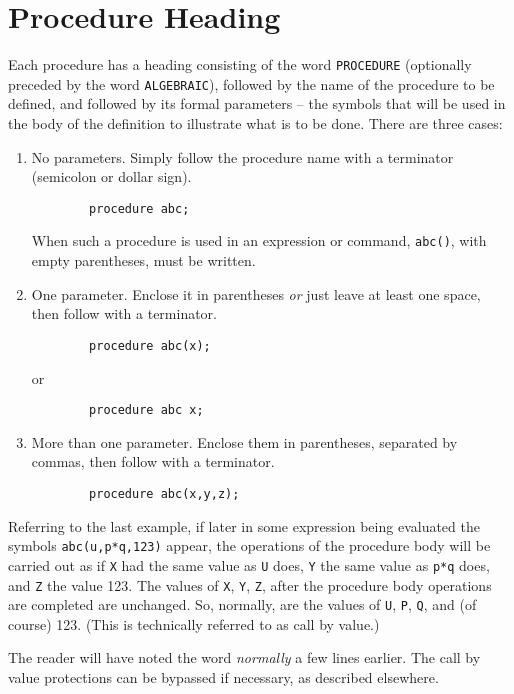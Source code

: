 \section{Procedure Heading}

Each procedure has a heading consisting of the word {\tt PROCEDURE}
(optionally preceded by the word {\tt ALGEBRAIC}), followed by the name of
the procedure to be defined, and followed by its formal parameters -- the
symbols that will be used in the body of the definition to illustrate
what is to be done.  There are three cases:
\begin{enumerate}
\item No parameters. Simply follow the procedure name with a terminator
(semicolon or dollar sign).
\begin{verbatim}
        procedure abc;
\end{verbatim}

When such a procedure is used in an expression or command, {\tt abc()}, with
empty parentheses, must be written.

\item One parameter.  Enclose it in parentheses {\em or\/} just leave at
least one space, then follow with a terminator.
\begin{verbatim}
        procedure abc(x);
\end{verbatim}
or
\begin{verbatim}
        procedure abc x;
\end{verbatim}

\item More than one parameter. Enclose them in parentheses, separated by
commas, then follow with a terminator.
\begin{verbatim}
        procedure abc(x,y,z);
\end{verbatim}
\end{enumerate}
Referring to the last example, if later in some expression being evaluated
the symbols {\tt abc(u,p*q,123)} appear, the operations of the procedure
body will be carried out as if {\tt X} had the same value as {\tt U} does,
{\tt Y} the same value as {\tt p*q} does, and {\tt Z} the value 123.  The
values of {\tt X}, {\tt Y}, {\tt Z}, after the procedure body operations
are completed are unchanged.  So, normally, are the values of {\tt U},
{\tt P}, {\tt Q}, and (of course) 123. (This is technically referred to as
call by value.)

The reader will have noted the word {\em normally\/} a few lines earlier. The
call by value protections can be bypassed if necessary, as described
elsewhere.

